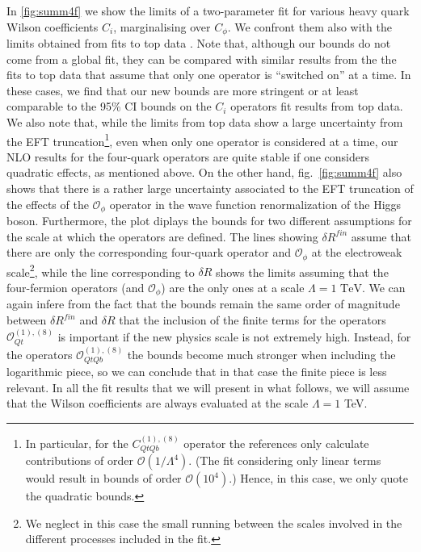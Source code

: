 In \autoref{fig:summ4f} we show the limits of a two-parameter fit for various heavy quark Wilson coefficients $C_{i}$, marginalising over $C_\phi$. 
We confront them also with the limits obtained from fits to top data \cite{Ethier:2021bye, Ellis:2020unq, Hartland:2019bjb, Brivio:2019ius,DHondt:2018cww, Zhang:2017mls}. 
Note that, although our bounds do not come from a global fit, they can be compared with similar results from the the fits to top data that assume that
only one operator is ``switched on'' at a time.
In these cases, we find that our new bounds are more stringent or at least comparable to the 95\% CI bounds on the  $C_{i}$ operators fit results from top data. We also note that, while the limits from top data show a large uncertainty from the EFT truncation\footnote{In particular, for the $C_{QtQb}^{(1),(8)}$ operator the references only calculate contributions of order $\mathcal{O}(1/\Lambda^4)$. (The fit considering only linear terms would result in bounds of order  $\mathcal{O}(10^4)$.) Hence, in this case, we only quote the quadratic bounds.}, even when only one operator is considered at a time, our NLO results for the four-quark operators are quite stable if one considers quadratic effects, as mentioned above. 
On the other hand, fig.~\ref{fig:summ4f} also shows that there is a rather large uncertainty associated to the EFT truncation of the effects of the $\mathcal{O}_{\phi}$ operator in the wave function renormalization of the Higgs boson. Furthermore, the plot diplays the bounds for two different assumptions for the scale at which the operators are defined. The lines showing $\delta R^{fin}$ assume that there are only the corresponding four-quark operator and $\mathcal{O}_{\phi}$ at the electroweak scale\footnote{We neglect in this case the small running between the scales involved in the different processes included in the fit.}, while the line corresponding to $\delta R$ shows the limits assuming that the four-fermion operators (and $\mathcal{O}_{\phi}$) are the only ones at a scale $\Lambda=1\text{ TeV}$. 
We can again infere from the fact that the bounds remain the same order of magnitude between $\delta R^{fin}$ and $\delta R$ that the inclusion of the finite terms for the operators $\mathcal{O}_{Qt}^{(1),(8)}$ is important if the new physics scale is not extremely high. Instead, for the operators $\mathcal{O}_{QtQb}^{(1),(8)}$ the bounds become much stronger when including the logarithmic piece, so we can conclude that in that case the finite piece is less relevant.
In all the fit results that we will present in what follows, we will assume that the Wilson coefficients are always evaluated at the scale $\Lambda=1$ TeV.

